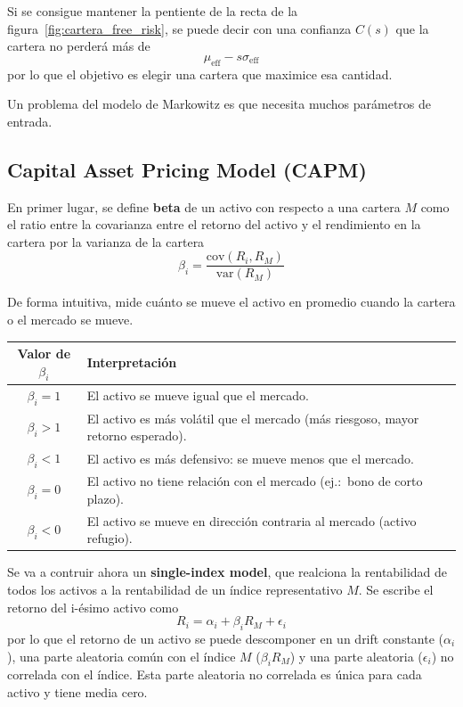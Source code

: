 Si se consigue mantener la pentiente de la recta de la figura~\ref{fig:cartera_free_risk}, se puede decir con una confianza $C(s)$ que la cartera no perderá más de
\[
    \mu_{\text{eff}} - s \sigma_{\text{eff}}
\]
por lo que el objetivo es elegir una cartera que maximice esa cantidad.

Un problema del modelo de Markowitz es que necesita muchos parámetros de entrada.






\subsection{Capital Asset Pricing Model (CAPM)}
En primer lugar, se define \textbf{beta} de un activo con respecto a una cartera $M$ como el ratio entre la covarianza entre el retorno del activo y el rendimiento en la cartera por la varianza de la cartera
\[
    \beta_i = \frac{\text{cov}(R_i, R_M)}{\text{var}(R_M)} 
\]

De forma intuitiva, mide cuánto se mueve el activo en promedio cuando la cartera o el mercado se mueve.
\begin{table}[H]
    \centering
    \begin{tabular}{|c|l|}
        \hline
        \textbf{Valor de \( \beta_i \)} & \textbf{Interpretación} \\
        \hline
        \( \beta_i = 1 \) & El activo se mueve igual que el mercado. \\
        \hline
        \( \beta_i > 1 \) & El activo es más volátil que el mercado (más riesgoso, mayor retorno esperado). \\
        \hline
        \( \beta_i < 1 \) & El activo es más defensivo: se mueve menos que el mercado. \\
        \hline
        \( \beta_i = 0 \) & El activo no tiene relación con el mercado (ej.:\ bono de corto plazo). \\
        \hline
        \( \beta_i < 0 \) & El activo se mueve en dirección contraria al mercado (activo refugio). \\
        \hline
    \end{tabular}
\end{table}

Se va a contruir ahora un \textbf{single-index model}, que realciona la rentabilidad de todos los activos a la rentabilidad de un índice representativo $M$. Se escribe el retorno del i-ésimo activo como
\[
    R_i = \alpha_i + \beta_i R_M + \epsilon_i
\]
por lo que el retorno de un activo se puede descomponer en un drift constante ($\alpha_i$), una parte aleatoria común con el índice $M$ ($\beta_i R_M$) y una parte aleatoria ($\epsilon_i$) no correlada con el índice. Esta parte aleatoria no correlada es única para cada activo y tiene media cero.

